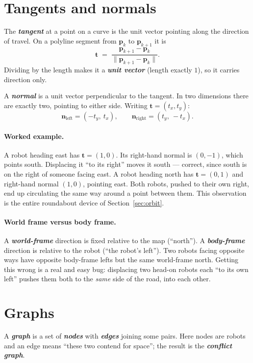 \documentclass[11pt,a4paper]{article}
\newcommand{\defn}[1]{\textbf{\textit{#1}}}
\begin{document}
\section{Tangents and normals}

The \defn{tangent} at a point on a curve is the unit vector pointing along the direction of
travel. On a polyline segment from $\mathbf{p}_k$ to $\mathbf{p}_{k+1}$ it is
\[
\mathbf{t} \;=\; \frac{\mathbf{p}_{k+1} - \mathbf{p}_k}{\|\mathbf{p}_{k+1} - \mathbf{p}_k\|}.
\]
Dividing by the length makes it a \defn{unit vector} (length exactly $1$), so it carries
direction only.

A \defn{normal} is a unit vector perpendicular to the tangent. In two dimensions there are
exactly two, pointing to either side. Writing $\mathbf{t} = (t_x, t_y)$:
\[
\mathbf{n}_{\mathrm{left}} = (-t_y,\ t_x),
\qquad
\mathbf{n}_{\mathrm{right}} = (t_y,\ -t_x).
\]

\paragraph{Worked example.} A robot heading east has $\mathbf{t} = (1,0)$. Its right-hand
normal is $(0,-1)$, which points south. Displacing it ``to its right'' moves it south ---
correct, since south is on the right of someone facing east. A robot heading north has
$\mathbf{t} = (0,1)$ and right-hand normal $(1,0)$, pointing east. Both robots, pushed to
their own right, end up circulating the same way around a point between them. This
observation is the entire roundabout device of Section~\ref{sec:orbit}.

\paragraph{World frame versus body frame.} A \defn{world-frame} direction is fixed relative
to the map (``north''). A \defn{body-frame} direction is relative to the robot (``the
robot's left''). Two robots facing opposite ways have opposite body-frame lefts but the same
world-frame north. Getting this wrong is a real and easy bug: displacing two head-on robots
each ``to its own left'' pushes them both to the \emph{same} side of the road, into each
other.

\section{Graphs}

A \defn{graph} is a set of \defn{nodes} with \defn{edges} joining some pairs. Here nodes are
robots and an edge means ``these two contend for space''; the result is the
\defn{conflict graph}.
\end{document}
